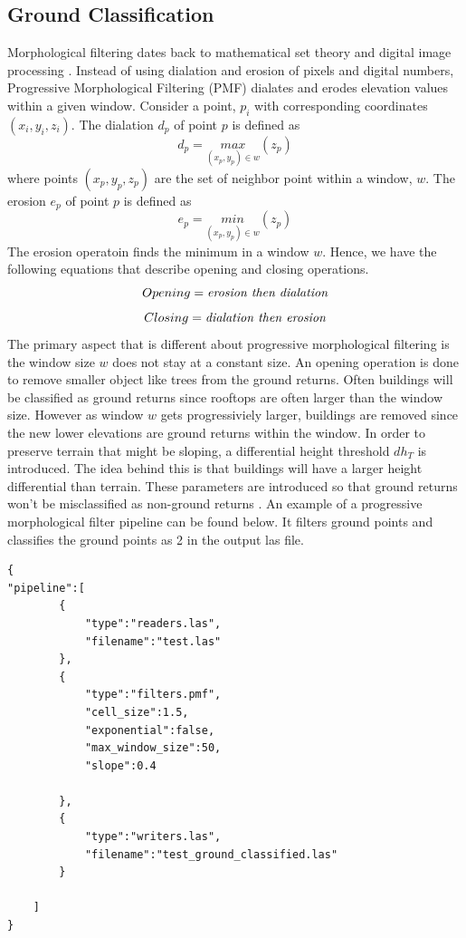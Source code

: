 \documentclass[11pt]{article}
\theoremstyle{definition}
\begin{document}
\subsection{Ground Classification}\label{sub:ground}
Morphological filtering dates back to mathematical set theory and digital image processing \cite{zhang2003progressive}.  Instead of using dialation and erosion of pixels and digital numbers, Progressive Morphological Filtering (PMF) dialates and erodes elevation values within a given window.  Consider a point, $p_i$ with corresponding coordinates $(x_i,y_i,z_i)$.  The dialation $d_{p}$ of point $p$ is defined as 
\begin{equation}\label{eqn:dialation}
d_{p}=\underset{(x_{p},y_{p})\in w}{max} (z_{p})
\end{equation}
where points $(x_{p},y_{p},z_{p})$ are the set of neighbor point within a window, $w$.  The erosion $e_p$ of point $p$ is defined as 
\begin{equation}\label{eqn:erosion}
e_{p}=\underset{(x_{p},y_{p})\in w}{min} (z_{p})
\end{equation}
The erosion operatoin finds the minimum in a window $w$.  Hence, we have the following equations that describe opening and closing operations.  
\begin{equation}\label{eqn:opening}
Opening=\text{\textit{erosion then dialation}}
\end{equation}
\begin{equation}\label{eqn:closing}
Closing=\text{\textit{dialation then erosion}}
\end{equation}
The primary aspect that is different about progressive morphological filtering is the window size $w$ does not stay at a constant size.  An opening operation is done to remove smaller object like trees from the ground returns.  Often buildings will be classified as ground returns since rooftops are often larger than the window size.  However as window $w$ gets progressiviely larger, buildings are removed since the new lower elevations are ground returns within the window.  In order to preserve terrain that might be sloping, a differential height threshold $dh_T$ is introduced.  The idea behind this is that buildings will have a larger height differential than terrain.  These parameters are introduced so that ground returns won't be misclassified as non-ground returns \cite{zhang2003progressive}.  An example of a progressive morphological filter pipeline can be found below. It filters ground points and classifies the ground points as 2 in the output las file.  
\begin{lstlisting}[title=Ground filtering pipeline, label=ground]
{
"pipeline":[
		{
			"type":"readers.las",
			"filename":"test.las"
		},
		{
			"type":"filters.pmf",
			"cell_size":1.5,
			"exponential":false,
			"max_window_size":50,
			"slope":0.4
			
		},
		{
			"type":"writers.las",
			"filename":"test_ground_classified.las"
		}

	]
}
\end{lstlisting}
\end{document}
